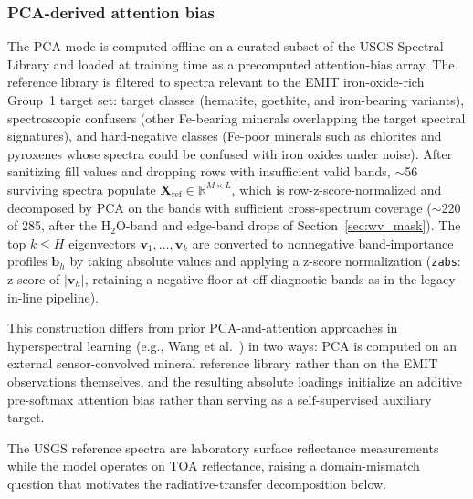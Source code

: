 \documentclass[preprint,12pt]{elsarticle}
\newcommand{\R}{\mathbb{R}}
\begin{document}
\subsubsection{PCA-derived attention bias}
\label{sec:pca_priors}

The PCA mode is computed offline on a curated subset of the USGS Spectral Library \cite{kokaly2017usgs} and loaded at training time as a precomputed attention-bias array. The reference library is filtered to spectra relevant to the EMIT iron-oxide-rich Group~1 target set: target classes (hematite, goethite, and iron-bearing variants), spectroscopic confusers (other Fe-bearing minerals overlapping the target spectral signatures), and hard-negative classes (Fe-poor minerals such as chlorites and pyroxenes whose spectra could be confused with iron oxides under noise). After sanitizing fill values and dropping rows with insufficient valid bands, $\sim$56 surviving spectra populate $\mathbf{X}_{\mathrm{ref}} \in \R^{M \times L}$, which is row-z-score-normalized and decomposed by PCA on the bands with sufficient cross-spectrum coverage ($\sim$220 of 285, after the H$_2$O-band and edge-band drops of Section~\ref{sec:wv_mask}). The top $k \leq H$ eigenvectors $\mathbf{v}_1, \ldots, \mathbf{v}_k$ are converted to nonnegative band-importance profiles $\mathbf{b}_h$ by taking absolute values and applying a z-score normalization (\texttt{zabs}: z-score of $|\mathbf{v}_h|$, retaining a negative floor at off-diagnostic bands as in the legacy in-line pipeline).

This construction differs from prior PCA-and-attention approaches in hyperspectral learning (e.g., Wang et al.~\cite{wang2021attention_pca_guided}) in two ways: PCA is computed on an external sensor-convolved mineral reference library rather than on the EMIT observations themselves, and the resulting absolute loadings initialize an additive pre-softmax attention bias rather than serving as a self-supervised auxiliary target.

The USGS reference spectra are laboratory surface reflectance measurements while the model operates on TOA reflectance, raising a domain-mismatch question that motivates the radiative-transfer decomposition below.
\end{document}
